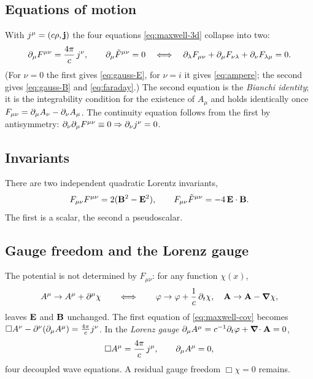 \subsection{Equations of motion}

With $j^\mu=(c\rho,\mathbf{j})$ the four equations \eqref{eq:maxwell-3d} collapse
into two:
\begin{equation}\label{eq:maxwell-cov}
\partial_\mu F^{\mu\nu}=\frac{4\pi}{c}\,j^\nu,\qquad
\partial_\mu\tilde F^{\mu\nu}=0
\quad\Longleftrightarrow\quad
\partial_\lambda F_{\mu\nu}+\partial_\mu F_{\nu\lambda}+\partial_\nu F_{\lambda\mu}=0 .
\end{equation}
(For $\nu=0$ the first gives \eqref{eq:gauss-E}, for $\nu=i$ it gives
\eqref{eq:ampere}; the second gives \eqref{eq:gauss-B} and
\eqref{eq:faraday}.)  The second equation is the \emph{Bianchi identity};
it is the integrability condition for the existence of $A_\mu$ and
holds identically once $F_{\mu\nu}=\partial_\mu A_\nu-\partial_\nu A_\mu$.  The
continuity equation follows from the first by antisymmetry:
$\partial_\nu\partial_\mu F^{\mu\nu}\equiv0\Rightarrow\partial_\nu j^\nu=0$.

\subsection{Invariants}

There are two independent quadratic Lorentz invariants,
\begin{equation}\label{eq:invariants}
F_{\mu\nu}F^{\mu\nu}=2(\mathbf{B}^2-\mathbf{E}^2),\qquad
F_{\mu\nu}\tilde F^{\mu\nu}=-4\,\mathbf{E}\cdot\mathbf{B} .
\end{equation}
The first is a scalar, the second a pseudoscalar.

\subsection{Gauge freedom and the Lorenz gauge}

The potential is not determined by $F_{\mu\nu}$: for any function
$\chi(x)$,
\begin{equation}\label{eq:gauge}
A^\mu\to A^\mu+\partial^\mu\chi\qquad\Longleftrightarrow\qquad
\varphi\to\varphi+\frac1c\,\partial_t\chi,\quad \mathbf{A}\to\mathbf{A}-\boldsymbol{\nabla}\chi,
\end{equation}
leaves $\mathbf{E}$ and $\mathbf{B}$ unchanged.  The first equation of
\eqref{eq:maxwell-cov} becomes $\Box A^\nu-\partial^\nu(\partial_\mu A^\mu)=\tfrac{4\pi}{c}j^\nu$.
In the \emph{Lorenz gauge} $\partial_\mu A^\mu=c^{-1}\partial_t\varphi+\boldsymbol{\nabla}\!\cdot\mathbf{A}=0$,
\begin{equation}\label{eq:lorenz-wave}
\Box A^\mu=\frac{4\pi}{c}\,j^\mu,\qquad \partial_\mu A^\mu=0 ,
\end{equation}
four decoupled wave equations.  A residual gauge freedom $\Box\chi=0$
remains.

